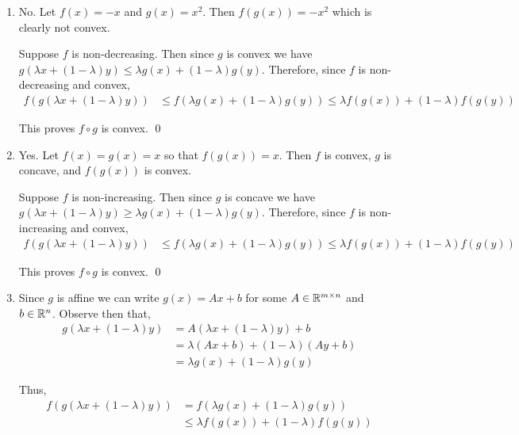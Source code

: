\documentclass[10pt]{article}
\begin{document}
\begin{solution}[Solution]
\begin{enumerate}[label=(\alph*)]
    \item No. Let \( f(x) = -x \) and \( g(x) = x^2 \). Then \( f(g(x)) = -x^2 \) which is clearly not convex. 

        Suppose \( f \) is non-decreasing. Then since \( g \) is convex we have \( g( \lambda x + (1-\lambda)y ) \leq \lambda g(x) + (1-\lambda) g(y) \). Therefore, since \( f \) is non-decreasing and convex,
        \begin{align*}
            f(g(\lambda x + (1-\lambda) y))
            & \leq f( \lambda g(x) + (1-\lambda) g(y))
             \leq \lambda f(g(x)) + (1-\lambda)f(g(y))
        \end{align*}
        
        This proves \( f\circ g \) is convex. \qed
    
    \item Yes. Let \( f(x) = g(x) = x \) so that \( f(g(x)) = x \). Then \( f \) is convex, \( g \) is concave, and \( f(g(x)) \) is convex.

        Suppose \( f \) is non-increasing. Then since \( g \) is concave we have \( g( \lambda x + (1-\lambda)y) \geq \lambda g(x) + (1-\lambda ) g(y) \). Therefore, since \( f \) is non-increasing and convex,
        \begin{align*}
            f(g(\lambda x + (1-\lambda)y))
            & \leq f( \lambda g(x) + (1-\lambda)g(y))
             \leq \lambda f(g(x)) + (1-\lambda)f(g(y))
        \end{align*}
        
        This proves \( f\circ g \) is convex. \qed
       
    \item
        Since \( g \) is affine we can write \( g(x) = Ax+b \) for some \( A\in \mathbb{R}^{m\times n} \) and \( b\in\mathbb{R}^n \). Observe then that,
        \begin{align*}
            g( \lambda x + (1-\lambda) y)
            &= A( \lambda x + (1-\lambda) y ) + b
            \\&= \lambda(Ax+b) + (1-\lambda)(Ay+b)
            \\&= \lambda g(x) + (1-\lambda) g(y)
        \end{align*}
        
        Thus,
        \begin{align*}
            f(g( \lambda x+ (1-\lambda)y))
            &= f( \lambda g(x) + (1-\lambda) g(y))
            \\&\leq \lambda f(g(x)) + (1-\lambda) f(g(y))
        \end{align*}
        

\end{enumerate}
\end{solution}
\end{document}
